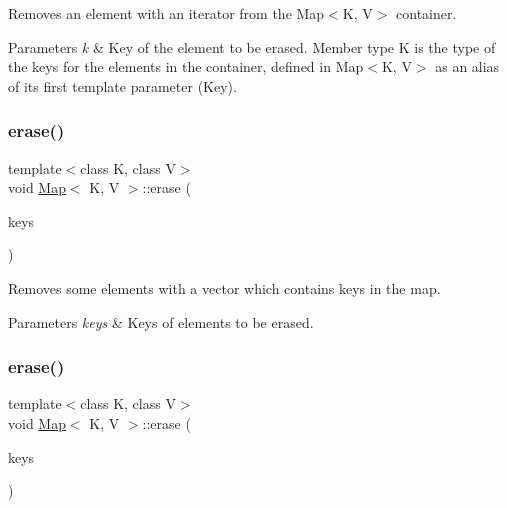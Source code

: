 Removes an element with an iterator from the Map$<$\+K, V$>$ container.


\begin{DoxyParams}{Parameters}
{\em k} & Key of the element to be erased. Member type \textquotesingle{}K\textquotesingle{} is the type of the keys for the elements in the container, defined in Map$<$\+K, V$>$ as an alias of its first template parameter (Key). \\
\hline
\end{DoxyParams}
\mbox{\label{classMap_af4f0fe5e119cd47edc51dadf13d001a8}} 
\subsubsection{\texorpdfstring{erase()}{erase()}\hspace{0.1cm}{\footnotesize\ttfamily [5/6]}}
{\footnotesize\ttfamily template$<$class K, class V$>$ \\
void \hyperlink{classMap}{Map}$<$ K, V $>$\+::erase (\begin{DoxyParamCaption}\item[{const std\+::vector$<$ K $>$ \&}]{keys }\end{DoxyParamCaption})\hspace{0.3cm}{\ttfamily [inline]}}

Removes some elements with a vector which contains keys in the map.


\begin{DoxyParams}{Parameters}
{\em keys} & Keys of elements to be erased. \\
\hline
\end{DoxyParams}
\mbox{\label{classMap_af4f0fe5e119cd47edc51dadf13d001a8}} 
\subsubsection{\texorpdfstring{erase()}{erase()}\hspace{0.1cm}{\footnotesize\ttfamily [6/6]}}
{\footnotesize\ttfamily template$<$class K, class V$>$ \\
void \hyperlink{classMap}{Map}$<$ K, V $>$\+::erase (\begin{DoxyParamCaption}\item[{const std\+::vector$<$ K $>$ \&}]{keys }\end{DoxyParamCaption})\hspace{0.3cm}{\ttfamily [inline]}}

